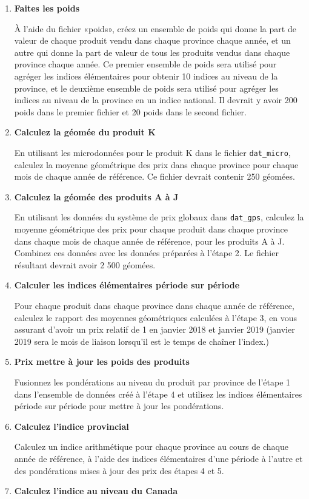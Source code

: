 \documentclass[]{article}
\begin{document}
\begin{enumerate}
\def\labelenumi{\arabic{enumi}.}
\item
  \textbf{Faites les poids}

  À l'aide du fichier «poids», créez un ensemble de poids qui donne la part de valeur de chaque produit vendu dans chaque province chaque année, et un autre qui donne la part de valeur de tous les produits vendus dans chaque province chaque année. Ce premier ensemble de poids sera utilisé pour agréger les indices élémentaires pour obtenir 10 indices au niveau de la province, et le deuxième ensemble de poids sera utilisé pour agréger les indices au niveau de la province en un indice national. Il devrait y avoir 200 poids dans le premier fichier et 20 poids dans le second fichier.
\item
  \textbf{Calculez la géomée du produit K}

  En utilisant les microdonnées pour le produit K dans le fichier \texttt{dat\_micro}, calculez la moyenne géométrique des prix dans chaque province pour chaque mois de chaque année de référence. Ce fichier devrait contenir 250 géomées.
\item
  \textbf{Calculez la géomée des produits A à J}

  En utilisant les données du système de prix globaux dans \texttt{dat\_gps}, calculez la moyenne géométrique des prix pour chaque produit dans chaque province dans chaque mois de chaque année de référence, pour les produits A à J. Combinez ces données avec les données préparées à l'étape 2. Le fichier résultant devrait avoir 2 500 géomées.
\item
  \textbf{Calculer les indices élémentaires période sur période}

  Pour chaque produit dans chaque province dans chaque année de référence, calculez le rapport des moyennes géométriques calculées à l'étape 3, en vous assurant d'avoir un prix relatif de 1 en janvier 2018 et janvier 2019 (janvier 2019 sera le mois de liaison lorsqu'il est le temps de chaîner l'index.)
\item
  \textbf{Prix mettre à jour les poids des produits}

  Fusionnez les pondérations au niveau du produit par province de l'étape 1 dans l'ensemble de données créé à l'étape 4 et utilisez les indices élémentaires période sur période pour mettre à jour les pondérations.
\item
  \textbf{Calculez l'indice provincial}

  Calculez un indice arithmétique pour chaque province au cours de chaque année de référence, à l'aide des indices élémentaires d'une période à l'autre et des pondérations mises à jour des prix des étapes 4 et 5.
\item
  \textbf{Calculez l'indice au niveau du Canada}


\end{enumerate}
\end{document}

